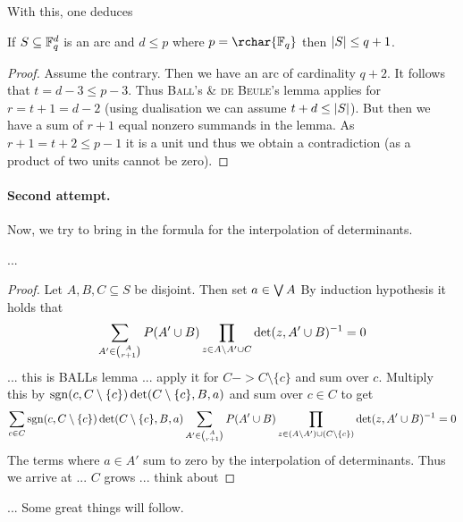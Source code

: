 \documentclass[a4paper]{article}
\begin{document}
With this, one deduces

\begin{corollary}\label{cor:mdsconjpcase}
  If $S\subseteq \mathbb{F}_{q}^d$ is an arc and $d\leq p$ where $p=\rchar{\field{q}}$ then $\left|S\right|\leq q+1$.
\end{corollary}

\begin{proof}
  Assume the contrary. Then we have an arc of cardinality $q+2$. It follows that $t=d-3\leq p-3$. Thus \textsc{Ball}'s \& \textsc{de Beule}'s lemma applies for $r=t+1=d-2$ (using dualisation we can assume $t+d\leq \left|S\right|$). But then we have a sum of $r+1$ equal nonzero summands in the lemma.
  As $r+1=t+2\leq p-1$ it is a unit und thus we obtain a contradiction
  (as a product of two units cannot be zero).
\end{proof}

\paragraph{Second attempt.} Now, we try to bring in the formula for
the interpolation of determinants.

\begin{lemma}
  ...
\end{lemma}

\begin{proof}
  Let $A,B,C\subseteq S$ be disjoint. Then set $a\in \mathop\mathrm{\bigvee}{A}$
  By induction hypothesis it holds that
  \begin{align}
    \sum_{A'\in\binom{A}{r+1}}{P(A'\setjoin B)\prod_{z\in A\setminus A'\setjoin C}\det(z,A'\setjoin B)^{-1}}=0
  \end{align}
  ... this is BALLs lemma ... apply it for $C-> C\setminus\{c\}$ and sum
  over $c$.
  Multiply this by $\mathop\mathrm{sgn}(c,C\setminus\{c\})\det(C\setminus\{c\},B,a)$
  and sum over $c\in C$ to get
  \begin{align}
    \sum_{c\in
      C}\sgn(c,C\setminus\{c\})\det(C\setminus\{c\},B,a)\sum_{A'\in\binom{A}{r+1}}{P(A'\setjoin
      B)\prod_{z\in(A\setminus A')\setjoin(C\setminus\{c\})}\det(z,A'\setjoin
      B)^{-1}}=0
  \end{align}
  The terms where $a\in A'$ sum to zero by the interpolation of
  determinants. Thus we arrive at ... $C$ grows ... think about
\end{proof}

... Some great things will follow.
\end{document}
